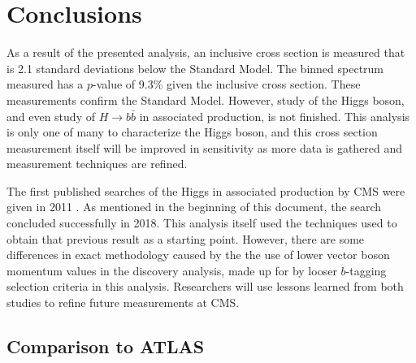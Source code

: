 \chapter{Conclusions} \label{ch:conclusion}

As a result of the presented analysis,
an inclusive cross section is measured that is 2.1 standard deviations below the Standard Model.
The binned spectrum measured has a $p$-value of 9.3\% given the inclusive cross section.
These measurements confirm the Standard Model.
However, study of the Higgs boson,
and even study of $H\rightarrow b\bar{b}$ in associated production, is not finished.
This analysis is only one of many to characterize the Higgs boson,
and this cross section measurement itself will be improved in sensitivity as more data is gathered
and measurement techniques are refined.

The first published searches of the Higgs in associated production by CMS
were given in 2011 \cite{CMS-PAS-HIG-11-012}.
As mentioned in the beginning of this document, the search concluded successfully in 2018.
This analysis itself used the techniques used to obtain that previous result as a starting point.
However, there are some differences in exact methodology caused by the the use of lower vector boson momentum values
in the discovery analysis, made up for by looser $b$-tagging selection criteria in this analysis.
Researchers will use lessons learned from both studies to refine future measurements at CMS.

\section{Comparison to ATLAS}

